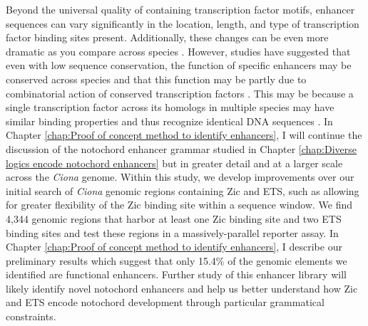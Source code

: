 \begin{dissertationintroduction}
    Beyond the universal quality of containing transcription factor motifs, enhancer sequences can vary significantly in the location, length, and type of transcription factor binding sites present. Additionally, these changes can be even more dramatic as you compare across species \cite{villar2015, ward2012, wong2020}. However, studies have suggested that even with low sequence conservation, the function of specific enhancers may be conserved across species and that this function may be partly due to combinatorial action of conserved transcription factors \cite{claussnitzer2014, wong2020}. This may be because a single transcription factor across its homologs in multiple species may have similar binding properties and thus recognize identical DNA sequences \cite{peter2011, wong2020}. In Chapter \ref{chap:Proof of concept method to identify enhancers}, I will continue the discussion of the notochord enhancer grammar studied in Chapter \ref{chap:Diverse logics encode notochord enhancers} but in greater detail and at a larger scale across the \textit{Ciona} genome. Within this study, we develop improvements over our initial search of \textit{Ciona} genomic regions containing Zic and ETS, such as allowing for greater flexibility of the Zic binding site within a sequence window. We find 4,344 genomic regions that harbor at least one Zic binding site and two ETS binding sites and test these regions in a massively-parallel reporter assay. In Chapter \ref{chap:Proof of concept method to identify enhancers}, I describe our preliminary results which suggest that only 15.4\% of the genomic elements we identified are functional enhancers. Further study of this enhancer library will likely identify novel notochord enhancers and help us better understand how Zic and ETS encode notochord development through particular grammatical constraints. 
    

\end{dissertationintroduction}
